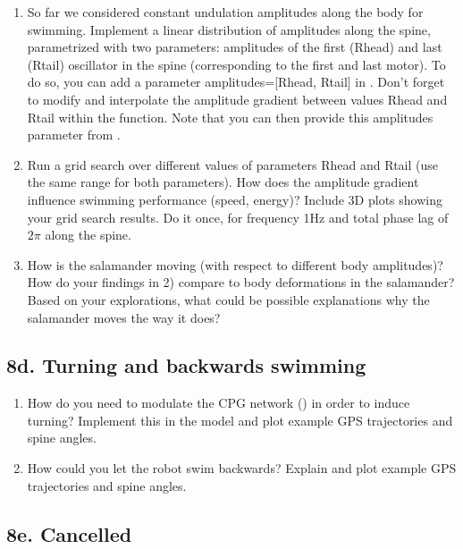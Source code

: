 \documentclass{cmc}
\begin{document}
\begin{enumerate}
\item So far we considered constant undulation amplitudes along the body for
  swimming. Implement a linear distribution of amplitudes along the spine,
  parametrized with two parameters: amplitudes of the first (Rhead) and last
  (Rtail) oscillator in the spine (corresponding to the first and last
  motor). To do so, you can add a parameter amplitudes=[Rhead, Rtail] in
  . Don't forget to modify
  \-
  and interpolate the amplitude gradient between values Rhead and Rtail within
  the function. Note that you can then provide this amplitudes parameter from
  .
\item Run a grid search over different values of parameters Rhead and Rtail (use
  the same range for both parameters). How does the amplitude gradient influence
  swimming performance (speed, energy)?  Include 3D plots showing your grid
  search results. Do it once, for frequency 1Hz and total phase lag of $2\pi$
  along the spine.
\item How is the salamander moving (with respect to different body amplitudes)?
  How do your findings in 2) compare to body deformations in the salamander?
  Based on your explorations, what could be possible explanations why the
  salamander moves the way it does?
\end{enumerate}


\subsection*{8d. Turning and backwards swimming}
\label{sec:turning-backwards}

\begin{enumerate}
\item How do you need to modulate the CPG network () in order
  to induce turning?  Implement this in the model and plot example GPS
  trajectories and spine angles.
\item How could you let the robot swim backwards? Explain and plot example GPS
  trajectories and spine angles.
\end{enumerate}



\subsection*{8e. Cancelled}
\end{document}
